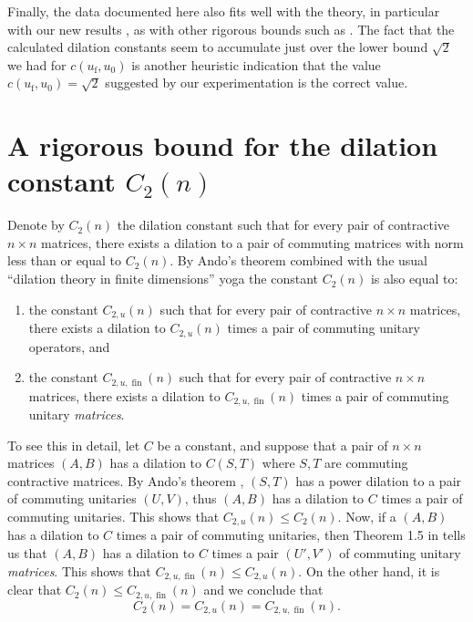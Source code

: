 Finally, the data documented here also fits well with the theory, in particular with our new results , as with other rigorous bounds such as . 
The fact that the calculated dilation constants seem to accumulate just over the lower bound $\sqrt{2}$ we had for $c(u_{\mathrm f}, u_0)$ is another heuristic indication that the value $c(u_{\mathrm f}, u_0) = \sqrt{2}$ suggested by our experimentation is the correct value. 




\appendix\section{A rigorous bound for the dilation constant \texorpdfstring{$C_2(n)$}{C2(n)}}


Denote by $C_2(n)$ the dilation constant such that for every pair of contractive $n\times n$ matrices, there exists a dilation to a pair of commuting matrices with norm less than or equal to $C_2(n)$. 
By Ando's theorem combined with the usual ``dilation theory in finite dimensions'' yoga \cite{hartz2021dilation,LevyShalit2014,McSh13} the constant $C_2(n)$ is also equal to:
\begin{enumerate}
\item the constant $C_{2,u}(n)$ such that for every pair of contractive $n\times n$ matrices, there exists a dilation to $C_{2,u}(n)$ times a pair of commuting unitary operators, and 
\item the constant $C_{2,u,\operatorname{fin}}(n)$ such that for every pair of contractive $n\times n$ matrices, there exists a dilation to $C_{2,u,\operatorname{fin}}(n)$ times a pair of commuting unitary {\em matrices}.
\end{enumerate}
To see this in detail, let $C$ be a constant, and suppose that a pair of $n \times n$ matrices $(A,B)$ has a dilation to $C(S,T)$ where $S,T$ are commuting contractive matrices. 
By Ando's theorem \cite{ando1963pair}, $(S,T)$ has a power dilation to a pair of commuting unitaries $(U,V)$, thus $(A,B)$ has a dilation to $C$ times a pair of commuting unitaries. This shows that $C_{2,u}(n) \leq C_2(n)$. 
Now, if a $(A,B)$ has a dilation to $C$ times a pair of commuting unitaries, then Theorem 1.5 in \cite{hartz2021dilation} tells us that $(A,B)$ has a dilation to $C$ times a pair $(U',V')$ of commuting unitary {\em matrices}. 
This shows that $C_{2,u,\operatorname{fin}}(n) \leq C_{2,u}(n)$. 
On the other hand, it is clear that $C_2(n) \leq C_{2,u,\operatorname{fin}}(n)$ and we conclude that 
\[
C_2(n) =  C_{2,u}(n) = C_{2,u,\operatorname{fin}}(n) . 
\]


